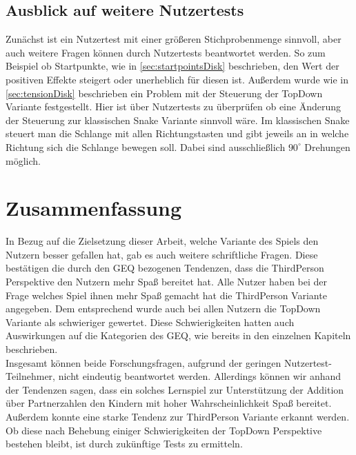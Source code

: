 \subsection{Ausblick auf weitere Nutzertests}
Zunächst ist ein Nutzertest mit einer größeren Stichprobenmenge sinnvoll, aber auch weitere Fragen können durch Nutzertests beantwortet werden. So zum Beispiel ob Startpunkte, wie in \ref{sec:startpointsDisk} beschrieben, den Wert der positiven Effekte steigert oder unerheblich für diesen ist. Außerdem wurde wie in \ref{sec:tensionDisk} beschrieben ein Problem mit der Steuerung der TopDown Variante festgestellt. Hier ist über Nutzertests zu überprüfen ob eine Änderung der Steuerung zur klassischen Snake Variante sinnvoll wäre. Im klassischen Snake steuert man die Schlange mit allen Richtungstasten und gibt jeweils an in welche Richtung sich die Schlange bewegen soll. Dabei sind ausschließlich $90^\circ$ Drehungen möglich.
\section{Zusammenfassung}
\label{sec:conclusionDisk}
In Bezug auf die Zielsetzung dieser Arbeit, welche Variante des Spiels den Nutzern besser gefallen hat, gab es auch weitere schriftliche Fragen. Diese bestätigen die durch den GEQ bezogenen Tendenzen, dass die ThirdPerson Perspektive den Nutzern mehr Spaß bereitet hat. Alle Nutzer haben bei der Frage welches Spiel ihnen mehr Spaß gemacht hat die ThirdPerson Variante angegeben. Dem entsprechend wurde auch bei allen Nutzern die TopDown Variante als schwieriger gewertet. Diese Schwierigkeiten hatten auch Auswirkungen auf die Kategorien des GEQ, wie bereits in den einzelnen Kapiteln beschrieben.\\
Insgesamt können beide Forschungsfragen, aufgrund der geringen Nutzertest-Teilnehmer, nicht eindeutig beantwortet werden. Allerdings können wir anhand der Tendenzen sagen, dass ein solches Lernspiel zur Unterstützung der Addition über Partnerzahlen den Kindern mit hoher Wahrscheinlichkeit Spaß bereitet. Außerdem konnte eine starke Tendenz zur ThirdPerson Variante erkannt werden. Ob diese nach Behebung einiger Schwierigkeiten der TopDown Perspektive bestehen bleibt, ist durch zukünftige Tests zu ermitteln.